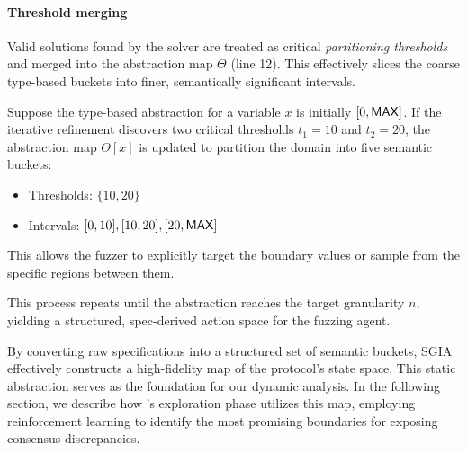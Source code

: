 \paragraph{Threshold merging}
Valid solutions found by the solver are treated as critical \textit{partitioning thresholds} and merged into the abstraction map $\Theta$ (line 12). This effectively slices the coarse type-based buckets into finer, semantically significant intervals.

\begin{example}
Suppose the type-based abstraction for a variable $x$ is initially $[0, {\sf MAX}]$. If the iterative refinement discovers two critical thresholds $t_1=10$ and $t_2=20$, the abstraction map $\Theta[x]$ is updated to partition the domain into five semantic buckets:
\begin{itemize}
    \item Thresholds: $\{10, 20\}$
    \item Intervals: $[0, 10], [10, 20], [20, {\sf MAX}]$
\end{itemize}
This allows the fuzzer to explicitly target the boundary values or sample from the specific regions between them.
\end{example}

This process repeats until the abstraction reaches the target granularity $n$, yielding a structured, spec-derived action space for the fuzzing agent.

By converting raw specifications into a structured set of semantic buckets, SGIA effectively constructs a high-fidelity map of the protocol's state space. This static abstraction serves as the foundation for our dynamic analysis. In the following section, we describe how \tool's exploration phase utilizes this map, employing reinforcement learning to identify the most promising boundaries for exposing consensus discrepancies.
